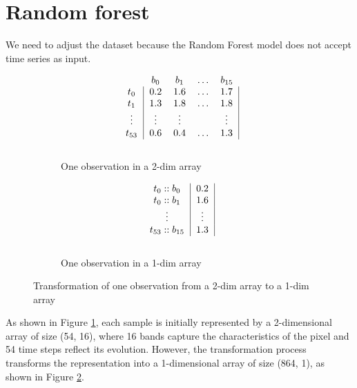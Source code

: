 \section{Random forest}

We need to adjust the dataset because the Random Forest model does not accept time series as input.

\begin{figure}[H]
  \begin{subfigure}{.49\textwidth}
    \centering
    \[
      \begin{blockarray}{ccccc}
        & b_0 & b_1 & \dots & b_{15} \\
        \begin{block}{c|cccc|}
          t_0 & 0.2 & 1.6 & \dots & 1.7  \\
          t_1 & 1.3 & 1.8 & \dots & 1.8 \\
          \vdots & \vdots & \vdots &  & \vdots   \\
          t_{53} & 0.6 & 0.4 & \dots & 1.3 \\
        \end{block}
      \end{blockarray}
    \]
    \caption{One observation in a 2-dim array}
    \label{fig:figtrans1}
  \end{subfigure}
  \begin{subfigure}{.49\textwidth}
    \centering
    \[
      \begin{blockarray}{cc}
      \begin{block}{c|c|}
        t_0::b_0 & 0.2 \\
        t_0::b_1 & 1.6 \\
        \vdots & \vdots \\
        t_{53}::b_{15} & 1.3 \\
      \end{block}
      \end{blockarray}
    \]
    \caption{One observation in a 1-dim array}
    \label{fig:figtrans2}
  \end{subfigure}
  \caption{Transformation of one observation from a 2-dim array to a 1-dim array}
  \label{fig:figtrans}
\end{figure}

As shown in Figure \ref{fig:figtrans1}, each sample is initially represented by a 2-dimensional array of size (54, 16), where 16 bands capture the characteristics of the pixel and 54 time steps reflect its evolution. 
However, the transformation process transforms the representation into a 1-dimensional array of size (864, 1), as shown in Figure \ref{fig:figtrans2}. 

